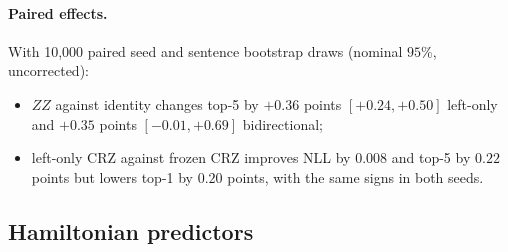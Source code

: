 \documentclass[11pt,a4paper]{article}
\begin{document}
  \paragraph{Paired effects.}
  With 10,000 paired seed and sentence bootstrap draws (nominal $95\%$, uncorrected):
  \begin{itemize}
    \item $ZZ$ against identity changes top-5 by $+0.36$ points $[+0.24,+0.50]$ left-only and $+0.35$ points $[-0.01,+0.69]$ bidirectional;
    \item left-only CRZ against frozen CRZ improves NLL by $0.008$ and top-5 by $0.22$ points but lowers top-1 by $0.20$ points, with the same signs in both seeds.
  \end{itemize}

  \subsection{Hamiltonian predictors}
\end{document}
